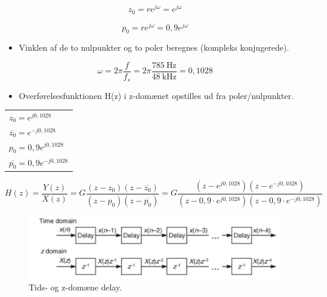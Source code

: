 \documentclass[danish]{article}
\begin{document}
\begin{equation}
z_0 = r e^{j\omega} = e^{j\omega}
\end{equation}

\begin{equation}
p_0 = r e^{j\omega} = 0,9 e^{j\omega}
\end{equation}

\begin{itemize}
	\item Vinklen af de to nulpunkter og to poler beregnes (kompleks konjugerede).
\end{itemize}

\begin{equation}
\omega = 2\pi \frac{f}{f_s} = 2\pi \frac{\SI{785}{\hertz}}{\SI{48}{\kilo\hertz}} = 0,1028
\end{equation}

\newpage
\begin{itemize}
	\item Overførelsesfunktionen H(z) i z-domænet opstilles ud fra poler/nulpunkter.
\end{itemize}

{\setlength\parindent{24pt}
\begin{tabular}{l}
	$z_0 =  e^{j0,1028}$ \\ 

	$\overline{z_0} =  e^{-j0,1028}$ \\ 
	
	$p_0 = 0,9 e^{j0,1028}$ \\ 
	
	$ \overline{p_0} = 0,9 e^{-j0,1028}$ \\ 
\end{tabular}} 

\begin{equation}
H(z) = \frac{Y(z)}{X(z)} = G \frac{(z - z_0)(z-\overline{z_0})}{(z - p_0)(z-\overline{p_0})} = G \frac{(z - e^{j0,1028})(z - e^{-j0,1028})}{(z - 0,9\cdot  e^{j0,1028})(z-0,9\cdot e^{-j0,1028})}
\end{equation}

\begin{figure}[H]
	\centering
	\includegraphics[width=0.6\linewidth]{graphics/z_domain_delay}
	\caption{Tids- og z-domæne delay.}
	\label{fig:z_domain_delay}
\end{figure}
\end{document}
